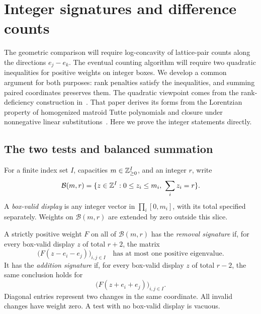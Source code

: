 \section{Integer signatures and difference counts}
\label{sec:signatures}

The geometric comparison will require log-concavity of lattice-pair
counts along the directions $e_j-e_k$.  The eventual counting algorithm
will require two quadratic inequalities for positive weights on integer
boxes.  We develop a common argument for both purposes: rank penalties
satisfy the inequalities, and summing paired coordinates preserves them.
The quadratic viewpoint comes from the rank-deficiency construction
in~\cite[Section~3, ``Quadratic signature inequalities'']{Parent}.
That paper derives its forms from the Lorentzian property of homogenized
matroid Tutte polynomials and closure under nonnegative linear
substitutions~\cite[Theorems~4.10 and~2.10]{BH2020}.
Here we prove the integer statements directly.

\subsection{The two tests and balanced summation}

For a finite index set $I$, capacities $m\in\mathbb Z_{\ge0}^I$, and an
integer $r$, write
\[
 \mathcal B(m,r)=\{z\in\mathbb Z^I:0\le z_i\le m_i,\ \sum_i z_i=r\}.
\]
A \emph{box-valid display} is any integer vector in
$\prod_i[0,m_i]$, with its total specified separately.
Weights on $\mathcal B(m,r)$ are extended by zero outside this slice.

\begin{definition}
\label{def:integer-signatures}
A strictly positive weight $F$ on all of $\mathcal B(m,r)$ has the
\emph{removal signature} if, for every box-valid display $z$ of total
$r+2$, the matrix
\begin{equation}
 \bigl(F(z-e_i-e_j)\bigr)_{i,j\in I}
 \quad\text{has at most one positive eigenvalue}.
 \label{eq:integer-removal-test}
\end{equation}
It has the \emph{addition signature} if, for every box-valid display
$z$ of total $r-2$, the same conclusion holds for
\begin{equation}
 \bigl(F(z+e_i+e_j)\bigr)_{i,j\in I}.
 \label{eq:integer-addition-test}
\end{equation}
Diagonal entries represent two changes in the same coordinate.
All invalid changes have weight zero.  A test with no box-valid
display is vacuous.
\end{definition}

